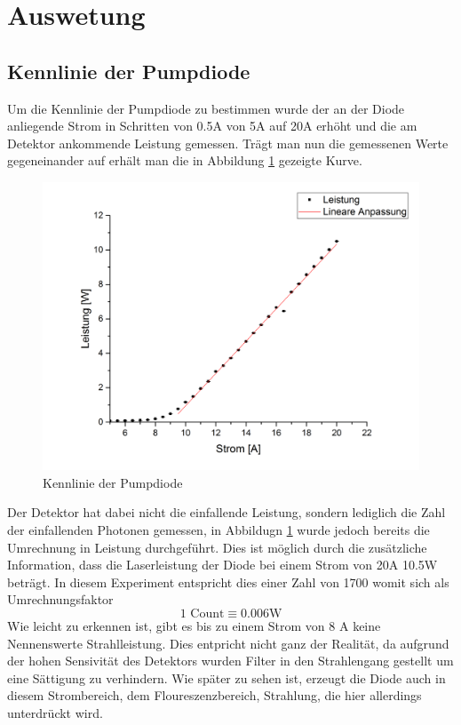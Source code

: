 \section{Auswetung}
\subsection{Kennlinie der Pumpdiode}
\label{diode}
Um die Kennlinie der Pumpdiode zu bestimmen wurde der an der Diode anliegende Strom in Schritten von 0.5A von 5A auf 20A erhöht und die am Detektor ankommende Leistung gemessen. \newline
Trägt man nun die gemessenen Werte gegeneinander auf erhält man die in Abbildung \ref{kennpump} gezeigte Kurve.
\begin{figure}[H]
	    \centering
		\includegraphics[scale=.5]{Bilder/Pumplaser.png}
		\caption{Kennlinie der Pumpdiode}
		\label{kennpump}
\end{figure}
Der Detektor hat dabei nicht die einfallende Leistung, sondern lediglich die Zahl der einfallenden Photonen gemessen, in Abbildugn \ref{kennpump} wurde jedoch bereits die Umrechnung in Leistung durchgeführt. Dies ist möglich durch die zusätzliche Information, dass die Laserleistung der Diode bei einem Strom von 20A 10.5W beträgt. In diesem Experiment entspricht dies einer Zahl von 1700 womit sich als Umrechnungsfaktor
\begin{equation}
1 \text{ Count}\equiv0.006\text{W}
\end{equation}
Wie leicht zu erkennen ist, gibt es bis zu einem Strom von 8 A keine Nennenswerte Strahlleistung. Dies entpricht nicht ganz der Realität, da aufgrund der hohen Sensivität des Detektors wurden Filter in den Strahlengang gestellt um eine Sättigung zu verhindern. Wie später zu sehen ist, erzeugt die Diode auch in diesem Strombereich, dem Floureszenzbereich, Strahlung, die hier allerdings unterdrückt wird.  \newline

